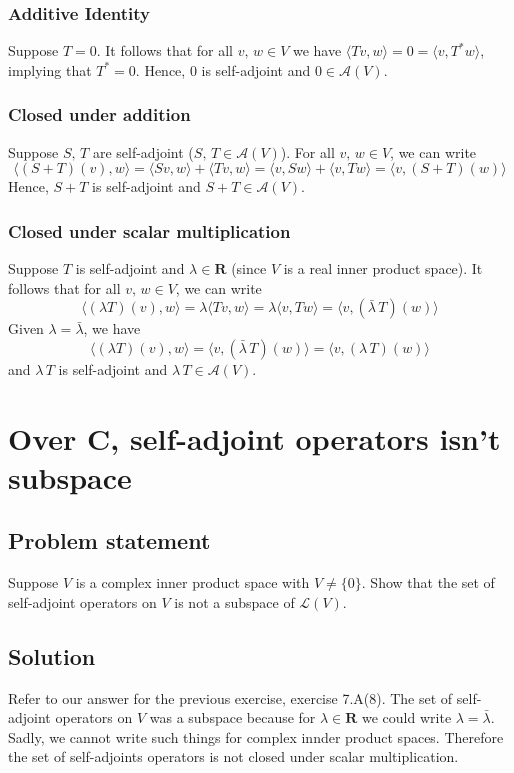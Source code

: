 \documentclass{article}
\begin{document}
\subsubsection*{Additive Identity}
Suppose $T=0$. It follows that for all $v,\,w\in V$ we have $\langle Tv,w\rangle=0=\langle v, T^*w\rangle$, implying that $T^*=0$. Hence, $0$ is self-adjoint and $0\in\mathcal{A}(V)$.

\subsubsection*{Closed under addition}
Suppose $S,\,T$ are self-adjoint ($S,\,T\in\mathcal{A}(V)$). For all $v,\,w\in V$, we can write
\[\langle (S+T)(v),w\rangle=\langle Sv,w\rangle+\langle Tv,w\rangle=\langle v,Sw\rangle+\langle v,Tw\rangle=\langle v,(S+T)(w)\rangle\]
Hence, $S+T$ is self-adjoint and $S+T\in\mathcal{A}(V)$.

\subsubsection*{Closed under scalar multiplication}
Suppose $T$ is self-adjoint and $\lambda\in\mathbf{R}$ (since $V$ is a real inner product space). It follows that for all $v,\,w\in V$, we can write
\[\langle (\lambda T)(v),w\rangle=\lambda\langle Tv,w\rangle=\lambda\langle v,Tw\rangle=\langle v,(\bar{\lambda}\,T)(w)\rangle\]
Given $\lambda=\bar{\lambda}$, we have
\[\langle (\lambda T)(v),w\rangle=\langle v,(\bar{\lambda}\,T)(w)\rangle=\langle v,(\lambda\,T)(w)\rangle\]
and $\lambda\,T$ is self-adjoint and $\lambda\,T\in\mathcal{A}(V)$.

\clearpage

\renewcommand{\thesection}{9}
\section{Over $\mathbf{C}$, self-adjoint operators isn't subspace}
\subsection*{Problem statement}
Suppose $V$ is a complex inner product space with $V\neq\{0\}$. Show that the set of self-adjoint operators on $V$ is not a subspace of $\mathcal{L}(V)$.

\subsection*{Solution}
Refer to our answer for the previous exercise, exercise 7.A(8). The set of self-adjoint operators on $V$ was a subspace because for $\lambda\in\mathbf{R}$ we could write $\lambda=\bar{\lambda}$. Sadly, we cannot write such things for complex innder product spaces. Therefore the set of self-adjoints operators is not closed under scalar multiplication.
\end{document}
